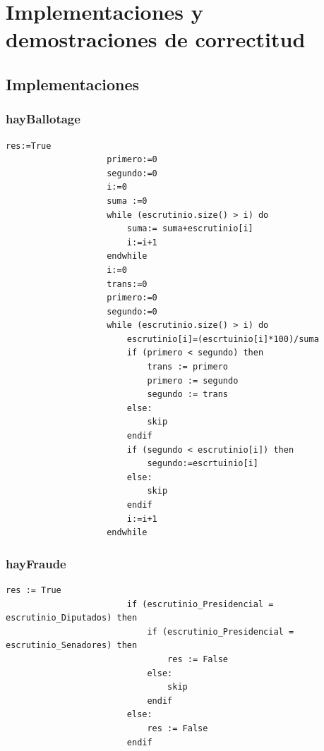 \documentclass[10pt,a4paper]{article}
\begin{document}
		
	


\section{Implementaciones y demostraciones de correctitud}

	\subsection{Implementaciones}
		
		\subsubsection{hayBallotage}
			\begin{minipage}[t]{\textwidth}
				\begin{lstlisting}[caption={()},label=code:for]
					res:=True
					primero:=0
					segundo:=0
					i:=0
					suma :=0
					while (escrutinio.size() > i) do
						suma:= suma+escrutinio[i]
						i:=i+1
					endwhile
					i:=0
					trans:=0
					primero:=0
					segundo:=0	
					while (escrutinio.size() > i) do
						escrutinio[i]=(escrtuinio[i]*100)/suma
						if (primero < segundo) then
							trans := primero
							primero := segundo
							segundo := trans
						else:
							skip
						endif
						if (segundo < escrutinio[i]) then
							segundo:=escrtuinio[i]
						else:
							skip
						endif
						i:=i+1
					endwhile
				\end{lstlisting}
			\end{minipage}

		\subsubsection{hayFraude}
			\begin{minipage}[t]{\textwidth}
				\begin{lstlisting}[caption={()},label=code:for]
						res := True
						if (escrutinio_Presidencial = escrutinio_Diputados) then 
							if (escrutinio_Presidencial = escrutinio_Senadores) then 
								res := False
							else:
								skip
							endif
						else:
							res := False
						endif
				\end{lstlisting}
			\end{minipage}
\end{document}
